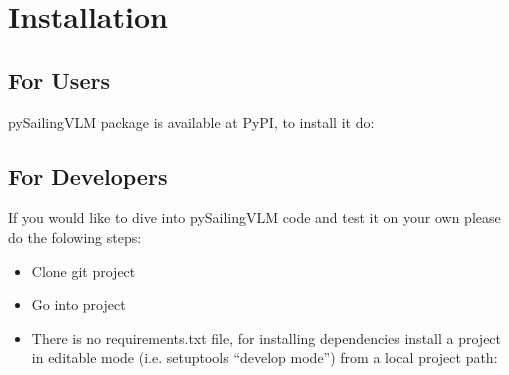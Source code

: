 \documentclass[letterpaper,10pt,english]{jupyterBook}
\begin{document}
\sphinxstepscope


\chapter{Installation}
\label{\detokenize{chapters/start/installation:installation}}\label{\detokenize{chapters/start/installation::doc}}

\section{For Users}
\label{\detokenize{chapters/start/installation:for-users}}
\sphinxAtStartPar
pySailingVLM package is available at PyPI, to install it do:

\begin{sphinxVerbatim}[commandchars=\\\{\}]
  
\end{sphinxVerbatim}


\section{For Developers}
\label{\detokenize{chapters/start/installation:for-developers}}
\sphinxAtStartPar
If you would like to dive into pySailingVLM code and test it on your own please do the folowing steps:
\begin{itemize}
\item {} 
\sphinxAtStartPar
Clone git project

\end{itemize}

\begin{sphinxVerbatim}[commandchars=\\\{\}]
  
\end{sphinxVerbatim}
\begin{itemize}
\item {} 
\sphinxAtStartPar
Go into project

\end{itemize}

\begin{sphinxVerbatim}[commandchars=\\\{\}]
 
\end{sphinxVerbatim}
\begin{itemize}
\item {} 
\sphinxAtStartPar
There is no requirements.txt file, for installing dependencies install a project in editable mode (i.e. setuptools “develop mode”) from a local project path:

\end{itemize}
\end{document}

